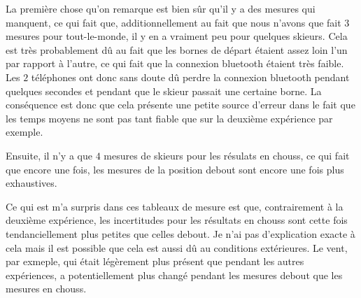 \documentclass{article}
\begin{document}
\begin{center}
\end{center}
\vspace{0.3cm}

La première chose qu'on remarque est bien sûr qu'il y a des mesures qui manquent, ce qui fait que, additionnellement au fait que nous n'avons que fait $3$ mesures pour tout-le-monde, il y en a vraiment peu pour quelques skieurs. Cela est très probablement dû au fait que les bornes de départ étaient assez loin l'un par rapport à l'autre, ce qui fait que la connexion bluetooth étaient très faible. Les $2$ téléphones ont donc sans doute dû perdre la connexion bluetooth pendant quelques secondes et pendant que le skieur passait une certaine borne. La conséquence est donc que cela présente une petite source d'erreur dans le fait que les temps moyens ne sont pas tant fiable que sur la deuxième expérience par exemple. 

\vspace{0.3cm}

Ensuite, il n'y a que $4$ mesures de skieurs pour les résulats en chouss, ce qui fait que encore une fois, les mesures de la position debout sont encore une fois plus exhaustives.

\vspace{0.3cm}

Ce qui est m'a surpris dans ces tableaux de mesure est que, contrairement à la deuxième expérience, les incertitudes pour les résultats en chouss sont cette fois tendanciellement plus petites que celles debout. Je n'ai pas d'explication exacte à cela mais il est possible que cela est aussi dû au conditions extérieures. Le vent, par exmeple, qui était légèrement plus présent que pendant les autres expériences, a potentiellement plus changé pendant les mesures debout que les mesures en chouss.
\end{document}
